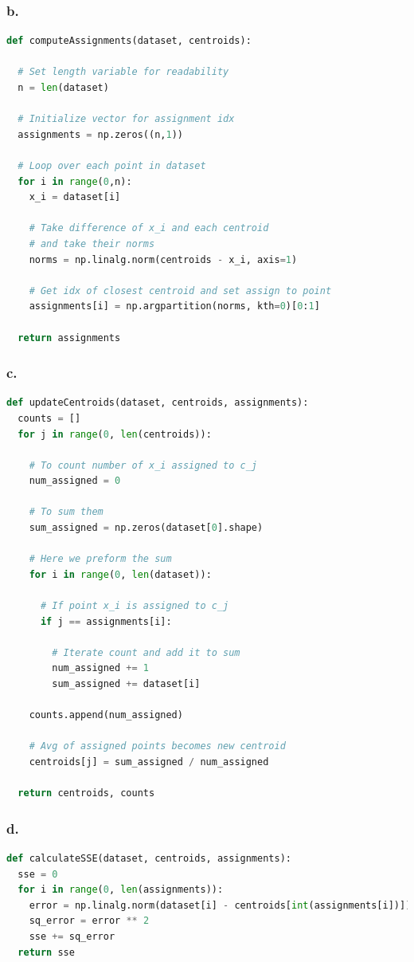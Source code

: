 \documentclass{article}
\theoremstyle{definition}
\begin{document}
       \subsubsection*{b.}
       \begin{lstlisting}[language=python]
def computeAssignments(dataset, centroids):

  # Set length variable for readability
  n = len(dataset)

  # Initialize vector for assignment idx
  assignments = np.zeros((n,1))

  # Loop over each point in dataset
  for i in range(0,n):
    x_i = dataset[i]

    # Take difference of x_i and each centroid
    # and take their norms
    norms = np.linalg.norm(centroids - x_i, axis=1)

    # Get idx of closest centroid and set assign to point
    assignments[i] = np.argpartition(norms, kth=0)[0:1]

  return assignments
       \end{lstlisting}
       \subsubsection*{c.}
       \begin{lstlisting}[language=python]
def updateCentroids(dataset, centroids, assignments):
  counts = []
  for j in range(0, len(centroids)):

    # To count number of x_i assigned to c_j
    num_assigned = 0

    # To sum them
    sum_assigned = np.zeros(dataset[0].shape)

    # Here we preform the sum
    for i in range(0, len(dataset)):

      # If point x_i is assigned to c_j
      if j == assignments[i]:

        # Iterate count and add it to sum
        num_assigned += 1
        sum_assigned += dataset[i]

    counts.append(num_assigned)

    # Avg of assigned points becomes new centroid
    centroids[j] = sum_assigned / num_assigned

  return centroids, counts
       \end{lstlisting}
       \subsubsection*{d.}
       \begin{lstlisting}[language=python]
def calculateSSE(dataset, centroids, assignments):
  sse = 0
  for i in range(0, len(assignments)):
    error = np.linalg.norm(dataset[i] - centroids[int(assignments[i])])
    sq_error = error ** 2
    sse += sq_error
  return sse
       \end{lstlisting}
\end{document}
